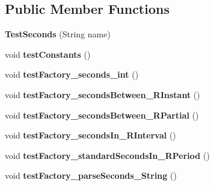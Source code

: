 \subsection*{Public Member Functions}
\begin{DoxyCompactItemize}
\item 
\hypertarget{classorg_1_1joda_1_1time_1_1_test_seconds_a00ad36dab076958f471d583c73160475}{{\bfseries Test\-Seconds} (String name)}\label{classorg_1_1joda_1_1time_1_1_test_seconds_a00ad36dab076958f471d583c73160475}

\item 
\hypertarget{classorg_1_1joda_1_1time_1_1_test_seconds_a6df652fe7fc9dea0f8b44ae72842dd27}{void {\bfseries test\-Constants} ()}\label{classorg_1_1joda_1_1time_1_1_test_seconds_a6df652fe7fc9dea0f8b44ae72842dd27}

\item 
\hypertarget{classorg_1_1joda_1_1time_1_1_test_seconds_ae702c529b999db5b70eab3e1e88da582}{void {\bfseries test\-Factory\-\_\-seconds\-\_\-int} ()}\label{classorg_1_1joda_1_1time_1_1_test_seconds_ae702c529b999db5b70eab3e1e88da582}

\item 
\hypertarget{classorg_1_1joda_1_1time_1_1_test_seconds_af6bbee4c2156a00f424eee7d07112830}{void {\bfseries test\-Factory\-\_\-seconds\-Between\-\_\-\-R\-Instant} ()}\label{classorg_1_1joda_1_1time_1_1_test_seconds_af6bbee4c2156a00f424eee7d07112830}

\item 
\hypertarget{classorg_1_1joda_1_1time_1_1_test_seconds_a854cc18e5d813ca429c3ea4e98f1014d}{void {\bfseries test\-Factory\-\_\-seconds\-Between\-\_\-\-R\-Partial} ()}\label{classorg_1_1joda_1_1time_1_1_test_seconds_a854cc18e5d813ca429c3ea4e98f1014d}

\item 
\hypertarget{classorg_1_1joda_1_1time_1_1_test_seconds_aa15c5b4a72f559db6cdc22eb34034b29}{void {\bfseries test\-Factory\-\_\-seconds\-In\-\_\-\-R\-Interval} ()}\label{classorg_1_1joda_1_1time_1_1_test_seconds_aa15c5b4a72f559db6cdc22eb34034b29}

\item 
\hypertarget{classorg_1_1joda_1_1time_1_1_test_seconds_a5e356c2ed6450ef598807306e4ac4ef7}{void {\bfseries test\-Factory\-\_\-standard\-Seconds\-In\-\_\-\-R\-Period} ()}\label{classorg_1_1joda_1_1time_1_1_test_seconds_a5e356c2ed6450ef598807306e4ac4ef7}

\item 
\hypertarget{classorg_1_1joda_1_1time_1_1_test_seconds_a563f0d0eda32cddbd702d43d14b77b71}{void {\bfseries test\-Factory\-\_\-parse\-Seconds\-\_\-\-String} ()}\label{classorg_1_1joda_1_1time_1_1_test_seconds_a563f0d0eda32cddbd702d43d14b77b71}


\end{DoxyCompactItemize}
